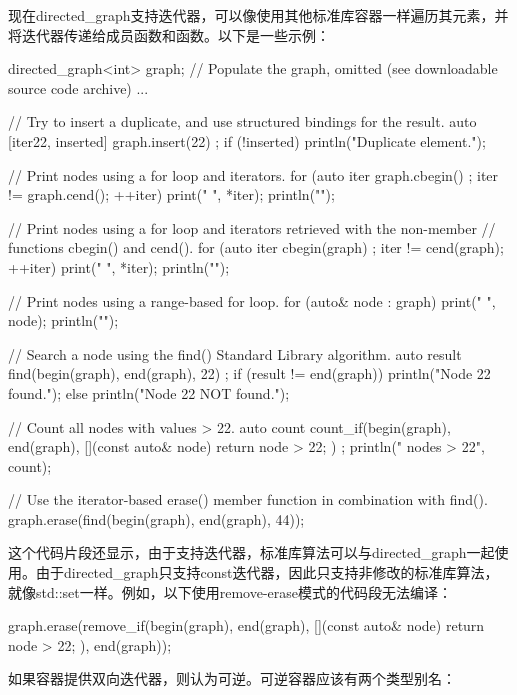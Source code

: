 
现在directed\_graph支持迭代器，可以像使用其他标准库容器一样遍历其元素，并将迭代器传递给成员函数和函数。以下是一些示例：

\begin{cpp}
directed_graph<int> graph;
// Populate the graph, omitted (see downloadable source code archive) ...

// Try to insert a duplicate, and use structured bindings for the result.
auto [iter22, inserted] { graph.insert(22) };
if (!inserted) { println("Duplicate element."); }

// Print nodes using a for loop and iterators.
for (auto iter { graph.cbegin() }; iter != graph.cend(); ++iter) {
    print("{} ", *iter);
}
println("");

// Print nodes using a for loop and iterators retrieved with the non-member
// functions cbegin() and cend().
for (auto iter { cbegin(graph) }; iter != cend(graph); ++iter) {
    print("{} ", *iter);
}
println("");

// Print nodes using a range-based for loop.
for (auto& node : graph) { print("{} ", node); }
println("");

// Search a node using the find() Standard Library algorithm.
auto result { find(begin(graph), end(graph), 22) };
if (result != end(graph)) { println("Node 22 found.");}
else { println("Node 22 NOT found."); }

// Count all nodes with values > 22.
auto count { count_if(begin(graph), end(graph),
    [](const auto& node) { return node > 22; }) };
println("{} nodes > 22", count);

// Use the iterator-based erase() member function in combination with find().
graph.erase(find(begin(graph), end(graph), 44));
\end{cpp}

这个代码片段还显示，由于支持迭代器，标准库算法可以与directed\_graph一起使用。由于directed\_graph只支持const迭代器，因此只支持非修改的标准库算法，就像std::set一样。例如，以下使用remove-erase模式的代码段无法编译：

\begin{cpp}
graph.erase(remove_if(begin(graph), end(graph),
    [](const auto& node) { return node > 22; }), end(graph));
\end{cpp}


如果容器提供双向迭代器，则认为可逆。可逆容器应该有两个类型别名：

